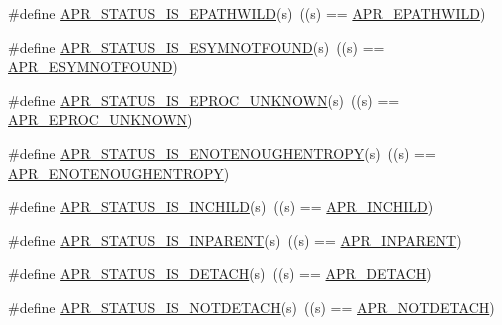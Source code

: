 \begin{DoxyCompactItemize}
\item 
\#define \mbox{\hyperlink{group___a_p_r___s_t_a_t_u_s___i_s_gae23aedf7ad4e6a111ffd6acf4167b00e}{A\+P\+R\+\_\+\+S\+T\+A\+T\+U\+S\+\_\+\+I\+S\+\_\+\+E\+P\+A\+T\+H\+W\+I\+LD}}(s)~((s) == \mbox{\hyperlink{group___a_p_r___error_ga01d0fb965051103b5c8f15a43ad2c767}{A\+P\+R\+\_\+\+E\+P\+A\+T\+H\+W\+I\+LD}})
\item 
\#define \mbox{\hyperlink{group___a_p_r___s_t_a_t_u_s___i_s_gafab6c5fe2f9b906d533d253097a16e09}{A\+P\+R\+\_\+\+S\+T\+A\+T\+U\+S\+\_\+\+I\+S\+\_\+\+E\+S\+Y\+M\+N\+O\+T\+F\+O\+U\+ND}}(s)~((s) == \mbox{\hyperlink{group___a_p_r___error_ga8d96410fc32408160e1e85e2e96402fa}{A\+P\+R\+\_\+\+E\+S\+Y\+M\+N\+O\+T\+F\+O\+U\+ND}})
\item 
\#define \mbox{\hyperlink{group___a_p_r___s_t_a_t_u_s___i_s_gab1267636d1f3fe0dcb79a22b735a5010}{A\+P\+R\+\_\+\+S\+T\+A\+T\+U\+S\+\_\+\+I\+S\+\_\+\+E\+P\+R\+O\+C\+\_\+\+U\+N\+K\+N\+O\+WN}}(s)~((s) == \mbox{\hyperlink{group___a_p_r___error_ga01b21dc62b410707f44641d3cea3e6ed}{A\+P\+R\+\_\+\+E\+P\+R\+O\+C\+\_\+\+U\+N\+K\+N\+O\+WN}})
\item 
\#define \mbox{\hyperlink{group___a_p_r___s_t_a_t_u_s___i_s_gab8b0af2df80bfb9edfc8dbcbb6bdf925}{A\+P\+R\+\_\+\+S\+T\+A\+T\+U\+S\+\_\+\+I\+S\+\_\+\+E\+N\+O\+T\+E\+N\+O\+U\+G\+H\+E\+N\+T\+R\+O\+PY}}(s)~((s) == \mbox{\hyperlink{group___a_p_r___error_gaaee9e4e763844197e3750bb66ff75cd0}{A\+P\+R\+\_\+\+E\+N\+O\+T\+E\+N\+O\+U\+G\+H\+E\+N\+T\+R\+O\+PY}})
\item 
\#define \mbox{\hyperlink{group___a_p_r___s_t_a_t_u_s___i_s_gad60d170a73ed74ec209a1b2165cacb61}{A\+P\+R\+\_\+\+S\+T\+A\+T\+U\+S\+\_\+\+I\+S\+\_\+\+I\+N\+C\+H\+I\+LD}}(s)~((s) == \mbox{\hyperlink{group___a_p_r___error_ga5a2bb63099778699feeae9627474c179}{A\+P\+R\+\_\+\+I\+N\+C\+H\+I\+LD}})
\item 
\#define \mbox{\hyperlink{group___a_p_r___s_t_a_t_u_s___i_s_ga4471f8de6eda3a673aa1f306114c012e}{A\+P\+R\+\_\+\+S\+T\+A\+T\+U\+S\+\_\+\+I\+S\+\_\+\+I\+N\+P\+A\+R\+E\+NT}}(s)~((s) == \mbox{\hyperlink{group___a_p_r___error_ga79abc0fb43e51e0db87f90fa49745d89}{A\+P\+R\+\_\+\+I\+N\+P\+A\+R\+E\+NT}})
\item 
\#define \mbox{\hyperlink{group___a_p_r___s_t_a_t_u_s___i_s_ga64d5d0a6bfe141a387dfdd430a38465b}{A\+P\+R\+\_\+\+S\+T\+A\+T\+U\+S\+\_\+\+I\+S\+\_\+\+D\+E\+T\+A\+CH}}(s)~((s) == \mbox{\hyperlink{group___a_p_r___error_gab3f8849983a52f6558016303fb4f5cff}{A\+P\+R\+\_\+\+D\+E\+T\+A\+CH}})
\item 
\#define \mbox{\hyperlink{group___a_p_r___s_t_a_t_u_s___i_s_ga3084551fdf84919e3c3db4384234521d}{A\+P\+R\+\_\+\+S\+T\+A\+T\+U\+S\+\_\+\+I\+S\+\_\+\+N\+O\+T\+D\+E\+T\+A\+CH}}(s)~((s) == \mbox{\hyperlink{group___a_p_r___error_ga83b8407fb5de5840f51dfd2c1439987b}{A\+P\+R\+\_\+\+N\+O\+T\+D\+E\+T\+A\+CH}})

\end{DoxyCompactItemize}
